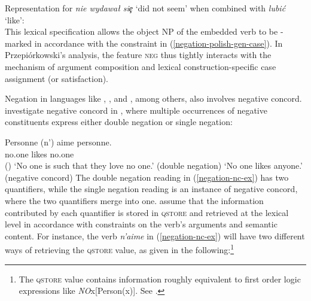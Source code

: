 \documentclass[output=paper
 	        ,biblatex
                ,babelshorthands
                ,newtxmath
                ,draftmode
                ,colorlinks, citecolor=brown
]{langscibook}
\begin{document}
\begin{exe}
\begin{xlist}
\begin{exe}
\begin{xlist}
\ea
\label{negation-polish-case}
Representation for \emph{nie wydawał siȩ} `did not seem' when combined with \emph{lubić} `like':\\
\z
%
This lexical specification allows the object NP of the embedded verb to be
-marked in accordance with the constraint in (\ref{negation-polish-gen-case}).
In Przepiórkowski's analysis, the feature
\textsc{neg} thus tightly interacts with the mechanism of argument composition and
lexical construction-specific case assignment (or satisfaction).

Negation in languages like , , and , among others, also involves negative concord.
 investigate  negative concord in , where multiple occurrences
of negative constituents express either
double negation or single negation:

\ea \label{negation-nc-ex}
\gll Personne (n')                 aime personne.\\
     no.one   \hphantom{(}\NEG{} likes no.one\\\hfill()
\glt `No one is such that they love no one.' \hfill (double negation)
\glt `No one likes anyone.' \hfill  (negative concord)
\z
%
%
The double negation reading in (\ref{negation-nc-ex}) has two quantifiers, while the single
negation reading is an instance of negative concord, where the two
quantifiers merge into one.  assume that the information contributed by
each quantifier is stored in \textsc{qstore} and retrieved at the
lexical level in accordance with constraints on the verb's arguments and semantic
content. For instance, the verb \textit{n'aime} in (\ref{negation-nc-ex}) will have two different ways of retrieving the
\textsc{qstore} value, as given in the following:\footnote{The
\textsc{qstore} value contains information
roughly equivalent to first order logic expressions like \textit{NO}x[Person(x)]. See
\citet{Swart:02}.}


\end{xlist}
\end{exe}
\end{xlist}
\end{exe}
\end{document}
